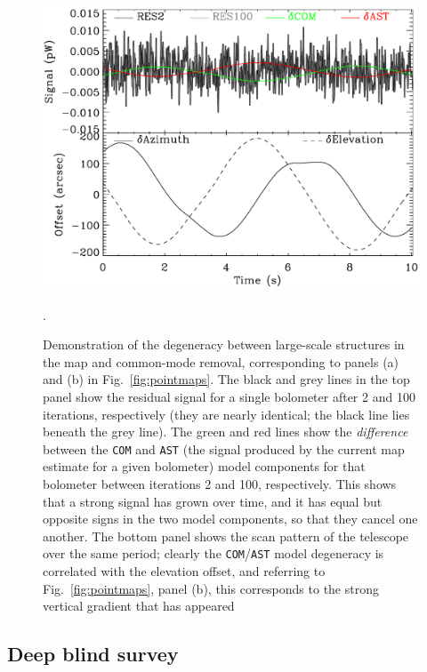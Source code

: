 \documentclass[useAMS,usenatbib,nofootinbib]{mn2e}
\newcommand{\model}[1]{\texttt{#1}}
\begin{document}
\begin{figure}
\centering
\includegraphics[width=\linewidth]{degeneracy.pdf}
\caption{Demonstration of the degeneracy between large-scale
  structures in the map and common-mode removal, corresponding to
  panels (a) and (b) in Fig.~\ref{fig:pointmaps}. The black and grey
  lines in the top panel show the residual signal for a single
  bolometer after 2 and 100 iterations, respectively (they are nearly
  identical; the black line lies beneath the grey line). The green and
  red lines show the \emph{difference} between the \model{COM} and
  \model{AST} (the signal produced by the current map estimate for a
  given bolometer) model components for that bolometer between
  iterations 2 and 100, respectively. This shows that a strong signal
  has grown over time, and it has equal but opposite signs in the two
  model components, so that they cancel one another. The bottom panel
  shows the scan pattern of the telescope over the same period;
  clearly the \model{COM}/\model{AST} model degeneracy is correlated
  with the elevation offset, and referring to
  Fig.~\ref{fig:pointmaps}, panel (b), this corresponds to the strong
  vertical gradient that has appeared}.
\label{fig:degeneracy}
\end{figure}

\subsection{Deep blind survey}
\label{sec:cosmo}
\end{document}
